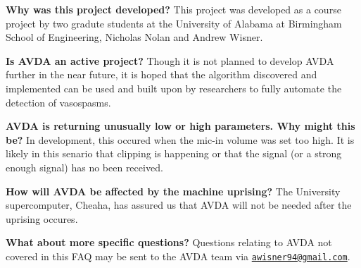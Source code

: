 \begin{DoxyItemize}
\item {\bfseries Why was this project developed?} This project was developed as a course project by two gradute students at the University of Alabama at Birmingham School of Engineering, Nicholas Nolan and Andrew Wisner.
\item {\bfseries Is A\+V\+D\+A an active project?} Though it is not planned to develop A\+V\+D\+A further in the near future, it is hoped that the algorithm discovered and implemented can be used and built upon by researchers to fully automate the detection of vasospasms.
\item {\bfseries A\+V\+D\+A is returning unusually low or high parameters. Why might this be?} In development, this occured when the mic-\/in volume was set too high. It is likely in this senario that clipping is happening or that the signal (or a strong enough signal) has no been received.
\item {\bfseries How will A\+V\+D\+A be affected by the machine uprising?} The University supercomputer, Cheaha, has assured us that A\+V\+D\+A will not be needed after the uprising occures.
\item {\bfseries What about more specific questions?} Questions relating to A\+V\+D\+A not covered in this F\+A\+Q may be sent to the A\+V\+D\+A team via \href{mailto:awisner94@gmail.com}{\tt awisner94@gmail.\+com}. 
\end{DoxyItemize}